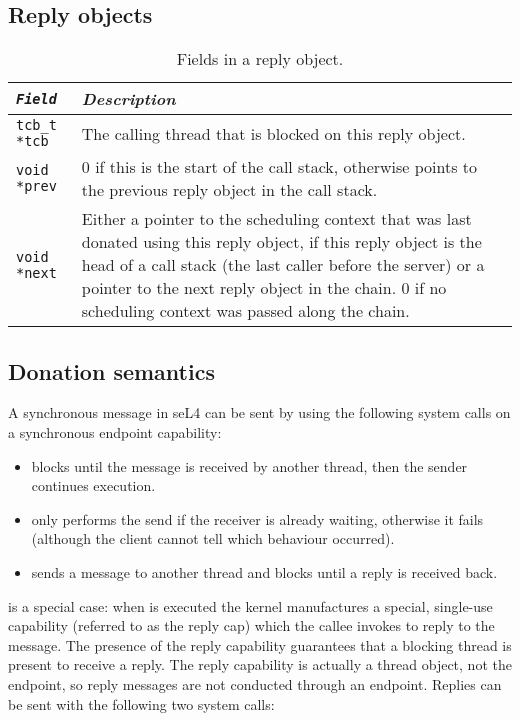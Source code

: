 \subsection{Reply objects}


\begin{table}
    \centering
    \begin{tabular}{>{\texttt\bgroup}l<{\egroup}  p{10cm} } \toprule
        \textnormal{\emph{Field}} & \emph{Description} \\\midrule
         tcb\_t *tcb    & The calling thread that is blocked on this reply object. \\
         void *prev & 0 if this is the start of the call stack, otherwise points to the previous
        reply object in the call stack. \\
         void *next & Either a pointer to the scheduling context that was last donated using this
        reply object, if this reply object is the head of a call stack (the last caller before the
        server) or a pointer to the next reply object in the chain. 0 if no scheduling context was
        passed along the chain.\\\bottomrule
    \end{tabular}
    \caption{Fields in a reply object.}
    \label{tab:reply_object}
\end{table}


\subsection{Donation semantics}

A synchronous message in seL4 can be sent by using the following system calls on a synchronous endpoint capability:

\begin{itemize}
	\item \send blocks until the message is received by another thread, then the sender continues execution.
	\item \nbsend only performs the send if the receiver is already waiting, otherwise it fails (although the client cannot tell which behaviour occurred).
	\item \call sends a message to another thread and blocks until a reply is received back.
\end{itemize}

\call is a special case: when \call is executed the kernel manufactures a special, single-use capability (referred to as the reply cap) which the callee invokes to reply to the message.
The presence of the reply capability guarantees that a blocking thread is present to receive a reply.
The reply capability is actually a thread object, not the endpoint, so reply messages are not conducted through an endpoint.
Replies can be sent with the following two system calls:

